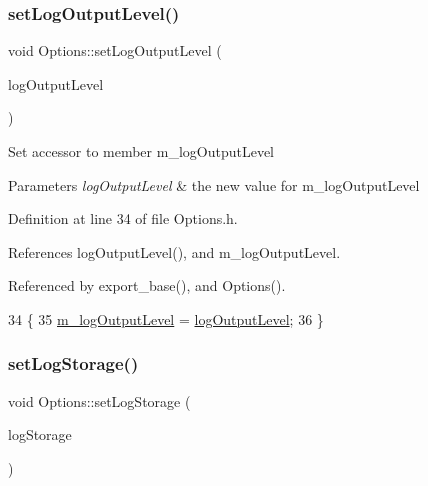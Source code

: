\subsubsection{\texorpdfstring{set\+Log\+Output\+Level()}{setLogOutputLevel()}}
{\footnotesize\ttfamily void Options\+::set\+Log\+Output\+Level (\begin{DoxyParamCaption}\item[{\hyperlink{classMsgSvc_ae671eb7301996cd049d2da8a65925926}{Msg\+Svc\+::\+Msg\+Level}}]{log\+Output\+Level }\end{DoxyParamCaption})\hspace{0.3cm}{\ttfamily [inline]}}

Set accessor to member m\+\_\+log\+Output\+Level 
\begin{DoxyParams}{Parameters}
{\em log\+Output\+Level} & the new value for m\+\_\+log\+Output\+Level \\
\hline
\end{DoxyParams}


Definition at line 34 of file Options.\+h.



References log\+Output\+Level(), and m\+\_\+log\+Output\+Level.



Referenced by export\+\_\+base(), and Options().


\begin{DoxyCode}
34                                                                \{
35                 \hyperlink{classOptions_a9ecfefe6bf44ff519369f38eb5c8147a}{m\_logOutputLevel} = \hyperlink{classOptions_a2d11716f34070dd7991648a26eb5d244}{logOutputLevel};
36         \}
\end{DoxyCode}
\mbox{\label{classOptions_a96f0288f5317cf371589f4db07e913b0}} 
\subsubsection{\texorpdfstring{set\+Log\+Storage()}{setLogStorage()}}
{\footnotesize\ttfamily void Options\+::set\+Log\+Storage (\begin{DoxyParamCaption}\item[{bool}]{log\+Storage }\end{DoxyParamCaption})\hspace{0.3cm}{\ttfamily [inline]}}

